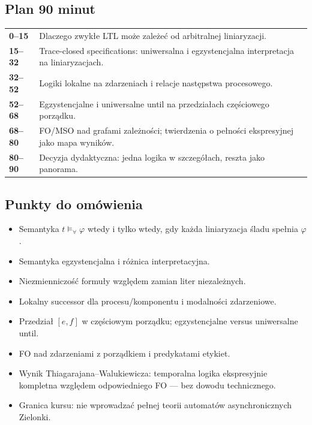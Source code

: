 \documentclass[11pt,a4paper]{article}
\begin{document}
\subsection{Plan 90 minut}
\begin{center}\small\begin{tabularx}{0.96\textwidth}{@{}>{\bfseries}p{18mm}X@{}}
0--15 & Dlaczego zwykłe LTL może zależeć od arbitralnej liniaryzacji.\\
15--32 & Trace-closed specifications: uniwersalna i egzystencjalna interpretacja na liniaryzacjach.\\
32--52 & Logiki lokalne na zdarzeniach i relacje następstwa procesowego.\\
52--68 & Egzystencjalne i uniwersalne until na przedziałach częściowego porządku.\\
68--80 & FO/MSO nad grafami zależności; twierdzenia o pełności ekspresyjnej jako mapa wyników.\\
80--90 & Decyzja dydaktyczna: jedna logika w szczegółach, reszta jako panorama.\\
\end{tabularx}\end{center}

\subsection{Punkty do omówienia}
\begin{itemize}
\item Semantyka $t\models_\forall\varphi$ wtedy i tylko wtedy, gdy każda liniaryzacja śladu spełnia $\varphi$.
\item Semantyka egzystencjalna i różnica interpretacyjna.
\item Niezmienniczość formuły względem zamian liter niezależnych.
\item Lokalny successor dla procesu/komponentu i modalności zdarzeniowe.
\item Przedział $[e,f]$ w częściowym porządku; egzystencjalne versus uniwersalne until.
\item FO nad zdarzeniami z porządkiem i predykatami etykiet.
\item Wynik Thiagarajana--Walukiewicza: temporalna logika ekspresyjnie kompletna względem odpowiedniego FO --- bez dowodu technicznego.
\item Granica kursu: nie wprowadzać pełnej teorii automatów asynchronicznych Zielonki.
\end{itemize}
\end{document}

